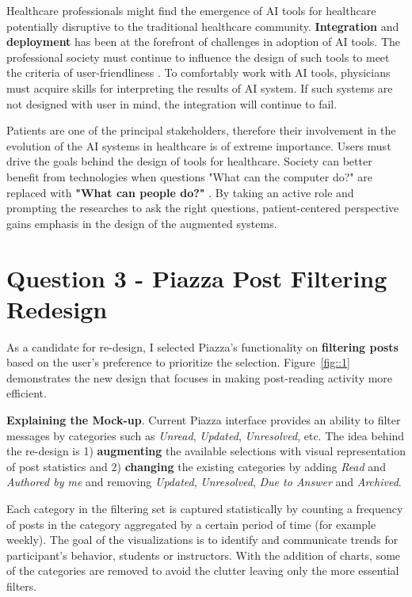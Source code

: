 \documentclass[12pt,letterpaper]{article}
\begin{document}
Healthcare professionals might find the emergence of AI tools for healthcare potentially disruptive to the traditional healthcare community. \textbf{Integration} and \textbf{deployment} has been at the forefront of challenges in adoption of AI tools. The professional society must continue to influence the design of such tools to meet the criteria of user-friendliness \cite{heathfield1993philosophies}. To comfortably work with AI tools, physicians must acquire skills for interpreting the results of AI system. If such systems are not designed with user in mind, the integration will continue to fail. 

Patients are one of the principal stakeholders, therefore their involvement in the evolution of the AI systems in healthcare is of extreme importance. Users must drive the goals behind the design of tools for healthcare. Society can better benefit from technologies when questions "What can the computer do?" are replaced with \textbf{"What can people do?"} \cite{hesse2007ehealth}. By taking an active role and prompting the researches to ask the right questions, patient-centered perspective gains emphasis in the design of the augmented systems. 

\section*{Question 3 - Piazza Post Filtering Redesign}

As a candidate for re-design, I selected Piazza's functionality on \textbf{filtering posts} based on the user's preference to prioritize the selection. Figure~\ref{fig::1} demonstrates the new design that focuses in making post-reading activity more efficient. 

\textbf{Explaining the Mock-up}. Current Piazza interface provides an ability to filter messages by categories such as \textit{Unread}, \textit{Updated}, \textit{Unresolved}, etc. The idea behind the re-design is 1) \textbf{augmenting} the available selections with visual representation of post statistics and 2) \textbf{changing} the existing categories by adding \textit{Read} and \textit{Authored by me} and removing \textit{Updated}, \textit{Unresolved}, \textit{Due to Answer} and \textit{Archived}.

Each category in the filtering set is captured statistically by counting a frequency of posts in the category aggregated by a certain period of time (for example weekly). The goal of the visualizations is to identify and communicate trends for participant's behavior, students or instructors. With the addition of charts, some of the categories are removed to avoid the clutter leaving only the more essential filters. 
\end{document}
